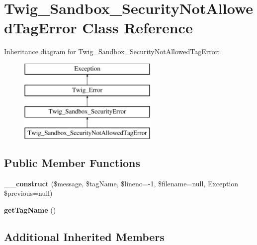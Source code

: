 \hypertarget{class_twig___sandbox___security_not_allowed_tag_error}{}\section{Twig\+\_\+\+Sandbox\+\_\+\+Security\+Not\+Allowed\+Tag\+Error Class Reference}
\label{class_twig___sandbox___security_not_allowed_tag_error}
Inheritance diagram for Twig\+\_\+\+Sandbox\+\_\+\+Security\+Not\+Allowed\+Tag\+Error\+:\begin{figure}[H]
\begin{center}
\leavevmode
\includegraphics[height=4.000000cm]{class_twig___sandbox___security_not_allowed_tag_error}
\end{center}
\end{figure}
\subsection*{Public Member Functions}
\begin{DoxyCompactItemize}
\item 
\hypertarget{class_twig___sandbox___security_not_allowed_tag_error_a40d87ba738afb9f0c4bdd0e740cdd68d}{}{\bfseries \+\_\+\+\_\+construct} (\$message, \$tag\+Name, \$lineno=-\/1, \$filename=null, Exception \$previous=null)\label{class_twig___sandbox___security_not_allowed_tag_error_a40d87ba738afb9f0c4bdd0e740cdd68d}

\item 
\hypertarget{class_twig___sandbox___security_not_allowed_tag_error_a2a21085426efb4a6c3d9ed4db9f8524c}{}{\bfseries get\+Tag\+Name} ()\label{class_twig___sandbox___security_not_allowed_tag_error_a2a21085426efb4a6c3d9ed4db9f8524c}

\end{DoxyCompactItemize}
\subsection*{Additional Inherited Members}


